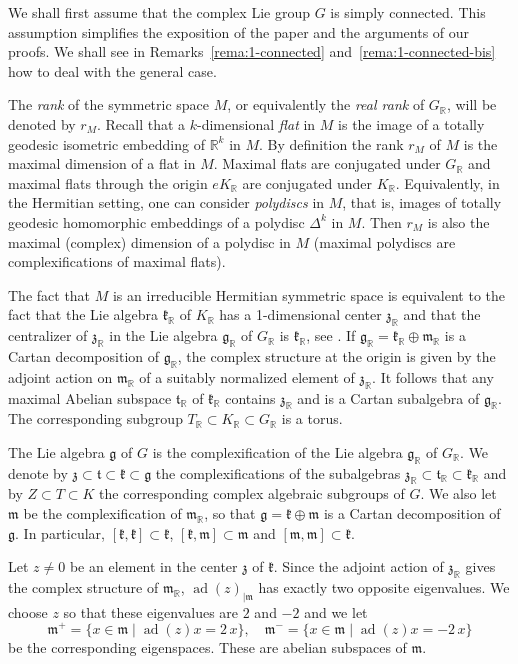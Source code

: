 \documentclass[JEP,XML,SOM,Unicode,NoFloatCountersInSection]{cedram}
\theoremstyle{plain}
\theoremstyle{definition}
\DeclareMathOperator{\ad}{ad}
\newcommand{\bR}{\mathbb{R}}
\newcommand{\fgg}{\mathfrak{g}}
\newcommand{\fk}{\mathfrak{k}}
\newcommand{\fm}{\mathfrak{m}}
\newcommand{\ft}{\mathfrak{t}}
\newcommand{\fz}{\mathfrak{z}}
\newcommand{\rkm}{{r_M}}
\begin{document}
We shall first assume that the complex Lie group $G$ is simply connected. This assumption simplifies the
exposition of the paper and the
arguments of our proofs. We shall see in Remarks~\ref{rema:1-connected}
and~\ref{rema:1-connected-bis} how to deal with the
general case.

The \emph{rank} of the symmetric space $M$, or equivalently the \emph{real rank} of $G_\bR$, will be
denoted by $\rkm$. Recall that a $k$-dimensional \emph{flat} in $M$ is the image of a totally geodesic
isometric embedding of $\bR^k$ in $M$. By definition the rank $\rkm$ of $M$ is the maximal dimension of
a flat in $M$. Maximal flats are conjugated under $G_\bR$ and maximal flats through the origin
$eK_\bR$ are conjugated under $K_\bR$. Equivalently, in the Hermitian setting,
one can consider \emph{polydiscs} in $M$, that is,
images of totally geodesic homomorphic embeddings of a polydisc $\Delta^k$ in $M$. Then $\rkm$ is also
the maximal (complex) dimension of a polydisc in $M$ (maximal polydiscs
are complexifications of maximal flats).

The fact that $M$ is an irreducible Hermitian symmetric space is equivalent to the fact that
the Lie algebra $\fk_\bR$ of $K_\bR$ has a 1-dimensional center $\fz_\bR$ and that the centralizer of
$\fz_\bR$ in the Lie algebra $\fgg_\bR$ of $G_\bR$ is $\fk_\bR$, see \eg \cite{Knapp}. If
$\fgg_\bR=\fk_\bR\oplus\fm_\bR$ is a Cartan decomposition of $\fgg_\bR$, the complex structure at the
origin is given by the adjoint action on $\fm_\bR$ of a suitably normalized element of $\fz_\bR$. It
follows that any maximal Abelian subspace $\ft_\bR$ of $\fk_\bR$ contains $\fz_\bR$ and is a Cartan
subalgebra of $\fgg_\bR$. The corresponding subgroup $T_\bR\subset K_\bR\subset G_\bR$ is a torus.

The Lie algebra $\fgg$ of $G$ is the complexification of the Lie algebra $\fgg_\bR$ of $G_\bR$. We
denote by $\fz\subset\ft\subset\fk \subset\fgg$ the complexifications of the subalgebras
$\fz_\bR\subset\ft_\bR\subset\fk_\bR$ and by $Z\subset T\subset K$ the corresponding complex algebraic
subgroups of $G$. We also let $\fm$ be the complexification of $\fm_\bR$, so that $\fgg=\fk\oplus\fm$
is a Cartan decomposition of $\fgg$. In particular, $[\fk,\fk]\subset\fk$, $[\fk,\fm]\subset\fm$ and $[\fm,\fm]
\subset\fk$.

Let $z\neq 0$ be an element in the center $\fz$ of $\fk$. Since the adjoint action of $\fz_\bR$ gives the
complex structure of $\fm_\bR$, $\ad(z)_{|\fm}$ has exactly two opposite eigenvalues. We
choose $z$ so that these eigenvalues are $2$ and $-2$
and we let
$$
\fm^+ = \{x\in\fm\mid \ad(z)x=2\,x\},\quad
\fm^- = \{x\in\fm\mid \ad(z)x=-2\,x\}
$$
be the corresponding eigenspaces. These are abelian subspaces of $\fm$.
\end{document}
